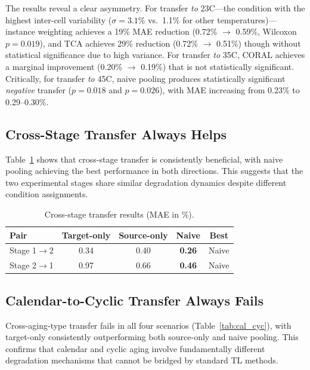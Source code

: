 \documentclass[review]{elsarticle}
\begin{document}
The results reveal a clear asymmetry. For transfer \textit{to} 23\textdegree C---the condition with the highest inter-cell variability ($\sigma = 3.1\%$ vs.\ 1.1\% for other temperatures)---instance weighting achieves a 19\% MAE reduction (0.72\% $\to$ 0.59\%, Wilcoxon $p = 0.019$), and TCA achieves 29\% reduction (0.72\% $\to$ 0.51\%) though without statistical significance due to high variance. For transfer \textit{to} 35\textdegree C, CORAL achieves a marginal improvement (0.20\% $\to$ 0.19\%) that is not statistically significant. Critically, for transfer \textit{to} 45\textdegree C, naive pooling produces statistically significant \textit{negative} transfer ($p = 0.018$ and $p = 0.026$), with MAE increasing from 0.23\% to 0.29--0.30\%.

\subsection{Cross-Stage Transfer Always Helps}

Table~\ref{tab:cross_stage} shows that cross-stage transfer is consistently beneficial, with naive pooling achieving the best performance in both directions. This suggests that the two experimental stages share similar degradation dynamics despite different condition assignments.

\begin{table}[htbp]
\centering
\caption{Cross-stage transfer results (MAE in \%).}
\label{tab:cross_stage}
\begin{tabular}{@{}lcccc@{}}
\toprule
Pair & Target-only & Source-only & Naive & Best \\
\midrule
Stage 1$\to$2 & 0.34 & 0.40 & \textbf{0.26} & Naive \\
Stage 2$\to$1 & 0.97 & 0.66 & \textbf{0.46} & Naive \\
\bottomrule
\end{tabular}
\end{table}

\subsection{Calendar-to-Cyclic Transfer Always Fails}

Cross-aging-type transfer fails in all four scenarios (Table~\ref{tab:cal_cyc}), with target-only consistently outperforming both source-only and naive pooling. This confirms that calendar and cyclic aging involve fundamentally different degradation mechanisms that cannot be bridged by standard TL methods.
\end{document}
